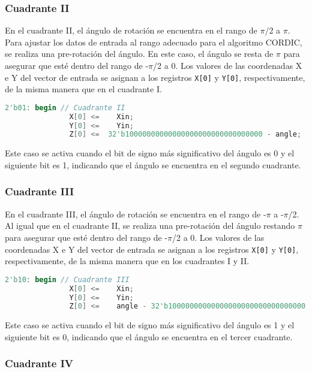 \documentclass[12pt,a4paper, twoside]{article} %
\begin{document}
\subsubsection{Cuadrante II}

En el cuadrante II, el ángulo de rotación se encuentra en el rango de $\pi$/2 a $\pi$. Para ajustar los datos de entrada al rango adecuado para el algoritmo CORDIC, se realiza una pre-rotación del ángulo. En este caso, el ángulo se resta de $\pi$ para asegurar que esté dentro del rango de -$\pi$/2 a 0. Los valores de las coordenadas X e Y del vector de entrada se asignan a los registros \texttt{X[0]} y \texttt{Y[0]}, respectivamente, de la misma manera que en el cuadrante I.

\begin{lstlisting}[language=Verilog]
       2'b01: begin // Cuadrante II
               X[0] <=    Xin;
               Y[0] <=    Yin;
               Z[0] <=  32'b10000000000000000000000000000000 - angle;                  
\end{lstlisting}

Este caso se activa cuando el bit de signo más significativo del ángulo es 0 y el siguiente bit es 1, indicando que el ángulo se encuentra en el segundo cuadrante.

\subsubsection{Cuadrante III}

En el cuadrante III, el ángulo de rotación se encuentra en el rango de -$\pi$ a -$\pi$/2. Al igual que en el cuadrante II, se realiza una pre-rotación del ángulo restando $\pi$ para asegurar que esté dentro del rango de -$\pi$/2 a 0. Los valores de las coordenadas X e Y del vector de entrada se asignan a los registros \texttt{X[0]} y \texttt{Y[0]}, respectivamente, de la misma manera que en los cuadrantes I y II.

\begin{lstlisting}[language=Verilog]
       2'b10: begin // Cuadrante III
               X[0] <=    Xin;
               Y[0] <=    Yin;
               Z[0] <=    angle - 32'b10000000000000000000000000000000; 
\end{lstlisting}

Este caso se activa cuando el bit de signo más significativo del ángulo es 1 y el siguiente bit es 0, indicando que el ángulo se encuentra en el tercer cuadrante.

\subsubsection{Cuadrante IV}
\end{document}
